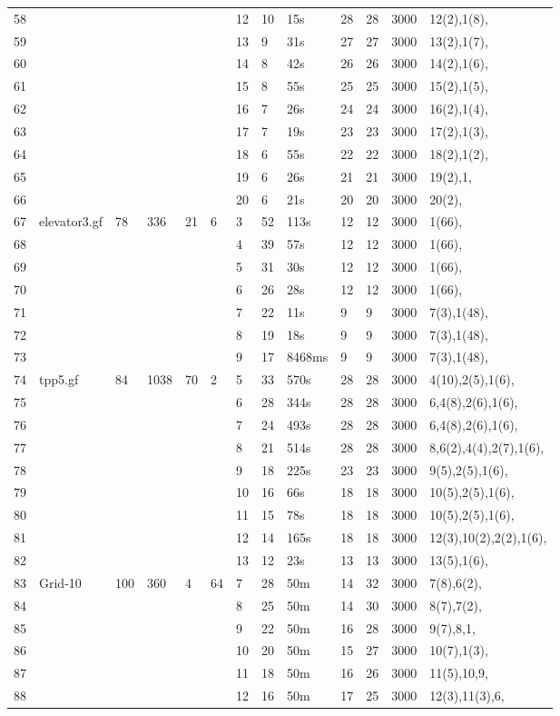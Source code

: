 \documentclass{article}
\begin{document}
\begin{longtable}{|l |l |l |l |l |l |l |l |l |l |l |l |l |}
58&&&&&&12&10&15s&28&28&3000&12(2),1(8),\\
59&&&&&&13&9&31s&27&27&3000&13(2),1(7),\\
60&&&&&&14&8&42s&26&26&3000&14(2),1(6),\\
61&&&&&&15&8&55s&25&25&3000&15(2),1(5),\\
62&&&&&&16&7&26s&24&24&3000&16(2),1(4),\\
63&&&&&&17&7&19s&23&23&3000&17(2),1(3),\\
64&&&&&&18&6&55s&22&22&3000&18(2),1(2),\\
65&&&&&&19&6&26s&21&21&3000&19(2),1,\\
66&&&&&&20&6&21s&20&20&3000&20(2),\\
67&elevator3.gf&78&336&21&6&3&52&113s&12&12&3000&1(66),\\
68&&&&&&4&39&57s&12&12&3000&1(66),\\
69&&&&&&5&31&30s&12&12&3000&1(66),\\
70&&&&&&6&26&28s&12&12&3000&1(66),\\
71&&&&&&7&22&11s&9&9&3000&7(3),1(48),\\
72&&&&&&8&19&18s&9&9&3000&7(3),1(48),\\
73&&&&&&9&17&8468ms&9&9&3000&7(3),1(48),\\
74&tpp5.gf&84&1038&70&2&5&33&570s&28&28&3000&4(10),2(5),1(6),\\
75&&&&&&6&28&344s&28&28&3000&6,4(8),2(6),1(6),\\
76&&&&&&7&24&493s&28&28&3000&6,4(8),2(6),1(6),\\
77&&&&&&8&21&514s&28&28&3000&8,6(2),4(4),2(7),1(6),\\
78&&&&&&9&18&225s&23&23&3000&9(5),2(5),1(6),\\
79&&&&&&10&16&66s&18&18&3000&10(5),2(5),1(6),\\
80&&&&&&11&15&78s&18&18&3000&10(5),2(5),1(6),\\
81&&&&&&12&14&165s&18&18&3000&12(3),10(2),2(2),1(6),\\
82&&&&&&13&12&23s&13&13&3000&13(5),1(6),\\
83&Grid-10&100&360&4&64&7&28&50m&14&32&3000&7(8),6(2),\\
84&&&&&&8&25&50m&14&30&3000&8(7),7(2),\\
85&&&&&&9&22&50m&16&28&3000&9(7),8,1,\\
86&&&&&&10&20&50m&15&27&3000&10(7),1(3),\\
87&&&&&&11&18&50m&16&26&3000&11(5),10,9,\\
88&&&&&&12&16&50m&17&25&3000&12(3),11(3),6,\\

\end{longtable}
\end{document}
